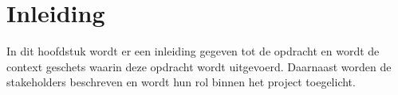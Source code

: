 \chapter{Inleiding}
In dit hoofdstuk wordt er een inleiding gegeven tot de opdracht en wordt de context geschets waarin deze opdracht wordt uitgevoerd.
Daarnaast worden de stakeholders beschreven en wordt hun rol binnen het project toegelicht.





